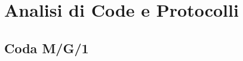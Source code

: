 \documentclass{article}
\begin{document}
%



\newpage
\section{Analisi di Code e Protocolli}

\subsection{Coda M/G/1}
\end{document}
